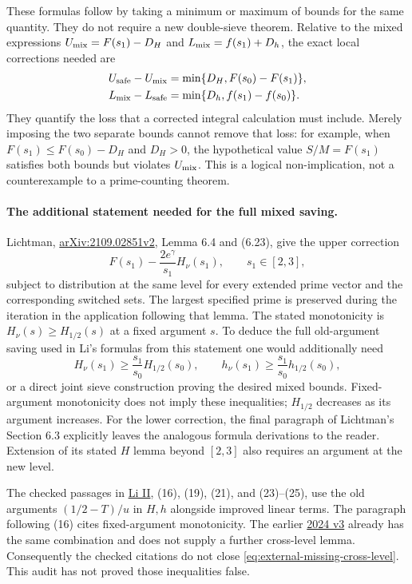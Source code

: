 These formulas follow by taking a minimum or maximum of bounds
for the same quantity. They do not require a new double-sieve
theorem. Relative to the mixed expressions
$U_{\rm mix}=F(s_1)-D_H$ and $L_{\rm mix}=f(s_1)+D_h$, the exact
local corrections needed are
\begin{align*}
 U_{\rm safe}-U_{\rm mix}
   &=\min\{D_H,F(s_0)-F(s_1)\},\\
 L_{\rm mix}-L_{\rm safe}
   &=\min\{D_h,f(s_1)-f(s_0)\}.
\end{align*}
They quantify the loss that a corrected integral calculation
must include. Merely imposing the two separate bounds cannot
remove that loss: for example, when
$F(s_1)\le F(s_0)-D_H$ and $D_H>0$, the hypothetical value
$S/M=F(s_1)$ satisfies both bounds but violates $U_{\rm mix}$.
This is a logical non-implication, not a counterexample to a
prime-counting theorem.

\paragraph{The additional statement needed for the full mixed saving.}
Lichtman,
\href{https://arxiv.org/html/2109.02851v2}{arXiv:2109.02851v2},
Lemma 6.4 and (6.23), give the upper correction
\[
 F(s_1)-\frac{2e^\gamma}{s_1}H_\nu(s_1),
 \qquad s_1\in[2,3],
\]
subject to distribution at the same level for every extended
prime vector and the corresponding switched sets.
The largest specified prime is preserved during the iteration
in the application following that lemma. The stated monotonicity
is $H_\nu(s)\ge H_{1/2}(s)$ at a fixed argument $s$.
To deduce the full old-argument saving used in Li's formulas
from this statement one would additionally need
\begin{equation}\label{eq:external-missing-cross-level}
 H_\nu(s_1)\ge\frac{s_1}{s_0}H_{1/2}(s_0),
 \qquad
 h_\nu(s_1)\ge\frac{s_1}{s_0}h_{1/2}(s_0),
\end{equation}
or a direct joint sieve construction proving the desired mixed
bounds. Fixed-argument monotonicity does not imply these
inequalities; $H_{1/2}$ decreases as its argument increases.
For the lower correction, the final paragraph of Lichtman's
Section 6.3 explicitly leaves the analogous formula derivations
to the reader. Extension of its stated $H$ lemma beyond $[2,3]$
also requires an argument at the new level.

The checked passages in
\href{https://imar.ro/journals/Mathematical_Reports/Pdfs/2026/1_2/3.pdf}
{Li II}, (16), (19), (21), and (23)--(25), use the old arguments
$(1/2-T)/u$ in $H,h$ alongside improved linear terms. The
paragraph following (16) cites fixed-argument monotonicity.
The earlier \href{https://arxiv.org/html/2405.05727v3}{2024 v3}
already has the same combination and does not supply a further
cross-level lemma. Consequently the checked citations do not
close \eqref{eq:external-missing-cross-level}. This audit has
not proved those inequalities false.

